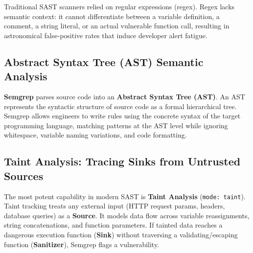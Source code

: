 Traditional SAST scanners relied on regular expressions (regex). Regex lacks semantic context: it cannot differentiate between a variable definition, a comment, a string literal, or an actual vulnerable function call, resulting in astronomical false-positive rates that induce developer alert fatigue.

\subsection{Abstract Syntax Tree (AST) Semantic Analysis}
\textbf{Semgrep} parses source code into an \textbf{Abstract Syntax Tree (AST)}. An AST represents the syntactic structure of source code as a formal hierarchical tree. Semgrep allows engineers to write rules using the concrete syntax of the target programming language, matching patterns at the AST level while ignoring whitespace, variable naming variations, and code formatting.

\subsection{Taint Analysis: Tracing Sinks from Untrusted Sources}
The most potent capability in modern SAST is \textbf{Taint Analysis} (\texttt{mode: taint}). Taint tracking treats any external input (HTTP request params, headers, database queries) as a \textbf{Source}. It models data flow across variable reassignments, string concatenations, and function parameters. If tainted data reaches a dangerous execution function (\textbf{Sink}) without traversing a validating/escaping function (\textbf{Sanitizer}), Semgrep flags a vulnerability.

